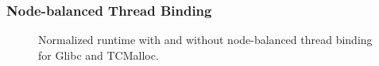 \subsubsection{Node-balanced Thread Binding}
\label{sec: threadbinding}


\begin{figure}[!h]
\centering
{}

\caption{Normalized runtime with and without node-balanced thread binding for Glibc and TCMalloc.}
\end{figure}


